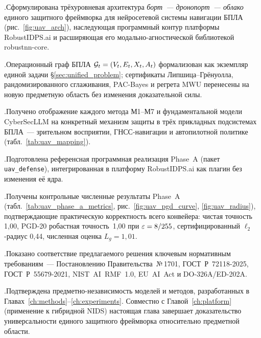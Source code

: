 .\quad Сформулирована трёхуровневая архитектура \emph{борт~---
дронопорт~--- облако} единого защитного фреймворка для нейросетевой
системы навигации БПЛА (рис.~\ref{fig:uav_arch}), наследующая
программный контур платформы \textsf{RobustIDPS.ai} и расширяющая его
модально-агностической библиотекой \textsf{robustnn-core}.

.\quad Операционный граф БПЛА $\mathcal{G}_t = (V_t,E_t,X_t,A_t)$
формализован как экземпляр единой задачи \S\ref{sec:unified_problem};
сертификаты Липшица--Грёнуолла, рандомизированного сглаживания,
PAC-Bayes и регрета MWU перенесены на новую предметную область без
изменения доказательной силы.

.\quad Получено отображение каждого метода \textsf{М1}--\textsf{М7}
и фундаментальной модели \textsf{CyberSecLLM} на конкретный механизм
защиты в трёх прикладных подсистемах БПЛА~--- зрительном восприятии,
ГНСС-навигации и автопилотной политике (табл.~\ref{tab:uav_mapping}).

.\quad Подготовлена референсная программная реализация
Phase~A (пакет \texttt{uav\_defense}), интегрированная в платформу
\textsf{RobustIDPS.ai} как плагин без изменения её ядра.

.\quad Получены контрольные численные результаты Phase~A
(табл.~\ref{tab:uav_phase_a_metrics}, рис.~\ref{fig:uav_pgd_curve},
\ref{fig:uav_radius}), подтверждающие практическую корректность всего
конвейера: чистая точность 1,00, PGD-20 робастная точность~1,00 при
$\varepsilon=8/255$, сертифицированный $\ell_2$-радиус 0,44, численная
оценка $L_g=1{,}01$.

.\quad Показано соответствие предлагаемого решения ключевым
нормативным требованиям~--- Постановлению Правительства~№\,1701,
\mbox{ГОСТ~Р~72118-2025}, \mbox{ГОСТ~Р~55679-2021},
\mbox{NIST~AI~RMF~1.0}, \mbox{EU~AI~Act} и \mbox{DO-326A/ED-202A}.

.\quad Подтверждена предметно-независимость моделей и
методов, разработанных в Главах~\ref{ch:methods}--\ref{ch:experiments}.
Совместно с Главой~\ref{ch:platform} (применение к гибридной NIDS)
настоящая глава завершает доказательство универсальности единого
защитного фреймворка относительно предметной области.
